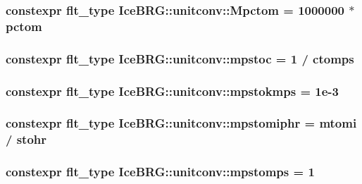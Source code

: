 \subsubsection[{Mpctom}]{\setlength{\rightskip}{0pt plus 5cm}constexpr {\bf flt\+\_\+type} Ice\+B\+R\+G\+::unitconv\+::\+Mpctom = 1000000 $\ast$ {\bf pctom}}\label{namespaceIceBRG_1_1unitconv_ad4408e8c25b2d1f1cb17bae1eddb5de4}
\hypertarget{namespaceIceBRG_1_1unitconv_a0840a18afe50bb92210e4c5aedb6704f}{}
\subsubsection[{mpstoc}]{\setlength{\rightskip}{0pt plus 5cm}constexpr {\bf flt\+\_\+type} Ice\+B\+R\+G\+::unitconv\+::mpstoc = 1 / {\bf ctomps}}\label{namespaceIceBRG_1_1unitconv_a0840a18afe50bb92210e4c5aedb6704f}
\hypertarget{namespaceIceBRG_1_1unitconv_a384cb6e5d3a93ef169a762850a496b50}{}
\subsubsection[{mpstokmps}]{\setlength{\rightskip}{0pt plus 5cm}constexpr {\bf flt\+\_\+type} Ice\+B\+R\+G\+::unitconv\+::mpstokmps = 1e-\/3}\label{namespaceIceBRG_1_1unitconv_a384cb6e5d3a93ef169a762850a496b50}
\hypertarget{namespaceIceBRG_1_1unitconv_af8f8d8f6cec6371e34cb5335b284d922}{}
\subsubsection[{mpstomiphr}]{\setlength{\rightskip}{0pt plus 5cm}constexpr {\bf flt\+\_\+type} Ice\+B\+R\+G\+::unitconv\+::mpstomiphr = {\bf mtomi} / {\bf stohr}}\label{namespaceIceBRG_1_1unitconv_af8f8d8f6cec6371e34cb5335b284d922}
\hypertarget{namespaceIceBRG_1_1unitconv_a0b42febee2d6ccb999c540bc0686e9c3}{}
\subsubsection[{mpstomps}]{\setlength{\rightskip}{0pt plus 5cm}constexpr {\bf flt\+\_\+type} Ice\+B\+R\+G\+::unitconv\+::mpstomps = 1}\label{namespaceIceBRG_1_1unitconv_a0b42febee2d6ccb999c540bc0686e9c3}
\hypertarget{namespaceIceBRG_1_1unitconv_a9d405defd89708f095c3e3a468e6aafa}{}
